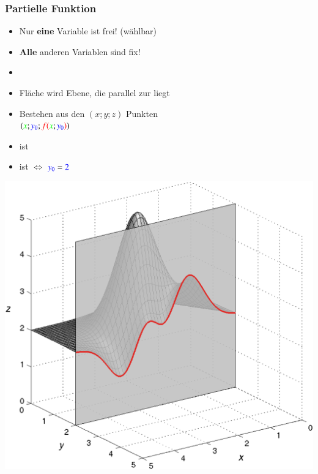 \subsubsection{Partielle Funktion}

\begin{itemize}
    \item Nur \textbf{eine} Variable ist frei! (wählbar)
    \item \textbf{Alle} anderen Variablen sind fix!
    \item[] 
\end{itemize}


\begin{minipage}[t]{0.48\columnwidth}
    \textbf{}
    \begin{itemize}
        \item Fläche wird  Ebene, die parallel zur  liegt
        \item Bestehen aus den $(x;y;z)$ Punkten\\
        $({\color{green}x} ; {\color{blue}y_0} ; {\color{red}f(}{\color{green}x};{\color{blue}y_0}{\color{red})})$
        \item {} ist 
        \item {} ist  $\Leftrightarrow$ ${{\color{blue}y_0} = {\color{blue}2}}$
    \end{itemize}
    
    \includegraphics[width=\columnwidth]{images/schnitt_y0.png}
\end{minipage}
